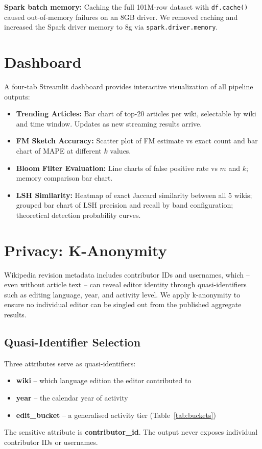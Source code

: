 \documentclass[conference]{IEEEtran}
\begin{document}
\textbf{Spark batch memory:} Caching the full 101M-row dataset with \texttt{df.cache()} caused out-of-memory failures on an 8GB driver. We removed caching and increased the Spark driver memory to 8g via \texttt{spark.driver.memory}.

\section{Dashboard}

A four-tab Streamlit dashboard provides interactive visualization of all pipeline outputs:

\begin{itemize}
  \item \textbf{Trending Articles:} Bar chart of top-20 articles per wiki, selectable by wiki and time window. Updates as new streaming results arrive.
  \item \textbf{FM Sketch Accuracy:} Scatter plot of FM estimate vs exact count and bar chart of MAPE at different $k$ values.
  \item \textbf{Bloom Filter Evaluation:} Line charts of false positive rate vs $m$ and $k$; memory comparison bar chart.
  \item \textbf{LSH Similarity:} Heatmap of exact Jaccard similarity between all 5 wikis; grouped bar chart of LSH precision and recall by band configuration; theoretical detection probability curves.
\end{itemize}

\section{Privacy: K-Anonymity}

Wikipedia revision metadata includes contributor IDs and usernames, which -- even without article text -- can reveal editor identity through quasi-identifiers such as editing language, year, and activity level. We apply k-anonymity \cite{sweeney2002} to ensure no individual editor can be singled out from the published aggregate results.

\subsection{Quasi-Identifier Selection}

Three attributes serve as quasi-identifiers:
\begin{itemize}
  \item \textbf{wiki} -- which language edition the editor contributed to
  \item \textbf{year} -- the calendar year of activity
  \item \textbf{edit\_bucket} -- a generalised activity tier (Table~\ref{tab:buckets})
\end{itemize}
The sensitive attribute is \textbf{contributor\_id}. The output never exposes individual contributor IDs or usernames.
\end{document}
